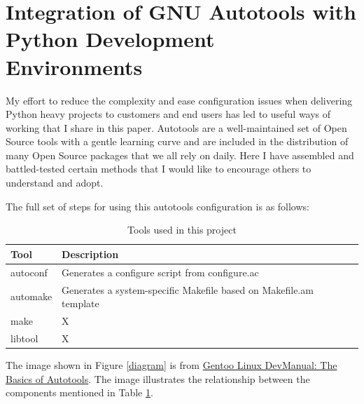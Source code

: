 






\section{\label{sec:Start}Integration of GNU Autotools with Python Development Environments}
\vspace{2mm}
\justifying
My effort to reduce the complexity and ease configuration issues when delivering Python heavy projects to customers and end users has led
to useful ways of working that I share in this paper. Autotools are a well-maintained set of Open Source tools with a gentle learning curve
and are included in the distribution of many Open Source packages that we all rely on daily. Here I have assembled and battled-tested certain
methods that I would like to encourage others to understand and adopt.

\justifying
The full set of steps for using this autotools configuration is as follows:

\begin{table}[ht]
    \centering
    \begin{tabular}{|l|l|}\hline
        Tool & Description \\\hline
        autoconf & Generates a configure script from configure.ac   \\\hline
        automake & Generates a system-specific Makefile based on Makefile.am template    \\\hline
        make  &   X    \\\hline
        libtool  &   X    \\\hline
    \end{tabular}
    \caption{Tools used in this project}
    \label{Autotools}
\end{table}

\justifying
The image shown in Figure \ref{diagram} is from \href{https://devmanual.gentoo.org/general-concepts/autotools/index.html}{Gentoo Linux DevManual: The Basics of Autotools}.
The image illustrates the relationship between the components mentioned in Table \ref{Autotools}.
\vspace{2mm}

